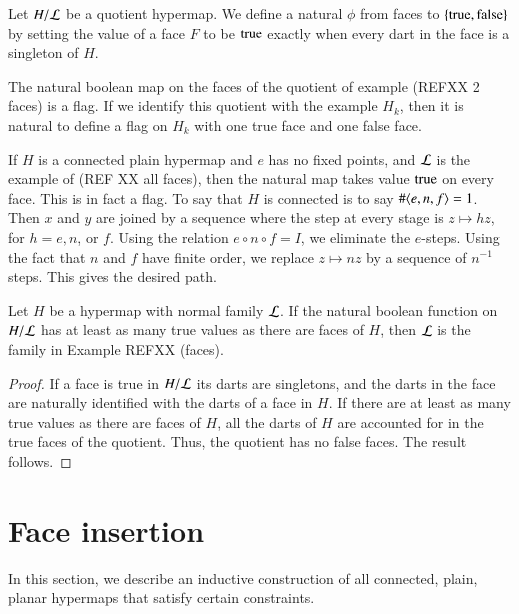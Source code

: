 \begin{example} Let $H/{\cal L}$ be a quotient hypermap.  We define
a natural $\phi$ from faces to $\{{\operatorname{true}},{\operatorname{false}}\}$ by setting
the value of a face $F$ to be ${\operatorname{true}}$ exactly when every dart in
the face is a singleton of $H$.
\end{example}

\begin{example} The natural boolean map on the faces of the
quotient of example (REFXX 2 faces) is a flag.  If we identify this
quotient with the example $H_k$, then it is natural to define a flag
on $H_k$ with one true face and one false face.
\end{example}

\begin{example} If $H$ is a connected plain hypermap and $e$ has no fixed points,
and $\cal L$ is the example of (REF XX all faces), then the natural
map takes value ${\operatorname{true}}$ on every face.  This is in fact a flag.
To say that $H$ is connected is to say $\#\langle e,n,f\rangle=1$. Then
$x$ and $y$ are joined by a sequence where the step at every stage
is $z\mapsto h z$, for $h=e,n$, or $f$.  Using the relation $e\circ
n\circ f = I$, we eliminate the $e$-steps. Using the fact that $n$
and $f$ have finite order, we replace $z \mapsto n z$ by a sequence
of $n^{-1}$ steps.  This gives the desired path.
\end{example}

\begin{lemma}  Let $H$ be a hypermap with normal family ${\cal L}$.
If the natural boolean function on $H/{\cal L}$ has at least as many
true values as there are faces of $H$, then $\cal L$ is the family
in Example REFXX (faces).
\end{lemma}

\begin{proof}  If a face is true in $H/{\cal L}$ its darts are
singletons, and the darts in the face are naturally identified with
the darts of a face in $H$.  If there are at least as many true
values as there are faces of $H$, all the darts of $H$ are accounted
for in the true faces of the quotient.  Thus, the quotient has no
false faces.  The result follows.
\end{proof}


\section{Face insertion}


In this section, we describe an inductive construction of all
connected, plain, planar hypermaps that satisfy certain constraints.

